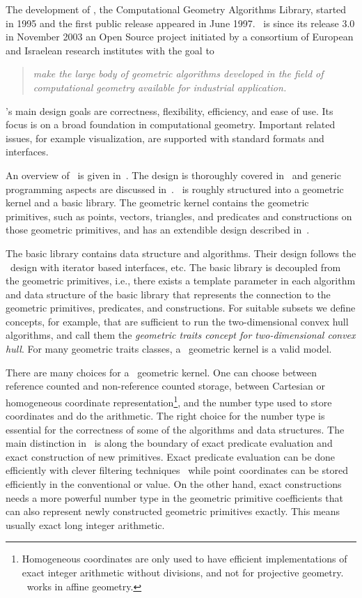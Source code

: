 The development of \cgal, the Computational Geometry Algorithms
Library, started in 1995 and the first public release appeared in June
1997. \cgal\ is since its release 3.0 in November 2003 an Open Source
project initiated by a consortium of European and Israelean research
institutes with the goal to
\begin{quote}
    {\em make the large body of geometric algorithms developed in the field
    of computational geometry available for industrial application.}
\end{quote}
\cgal's main design goals are correctness, flexibility, efficiency,
and ease of use. Its focus is on a broad foundation in computational
geometry. Important related issues, for example visualization, are
supported with standard formats and interfaces.

An overview of \cgal\ is given in~\cite{Kettner04Handbook}. The design
is thoroughly covered in~\cite{fgkss-dccga-00} and generic programming
aspects are discussed in~\cite{bksv-agppd-00}. \cgal\ is roughly
structured into a geometric kernel and a basic library. The geometric
kernel contains the geometric primitives, such as points, vectors,
triangles, and predicates and constructions on those geometric
primitives, and has an extendible design described
in~\cite{hhkps-aegk-01}. 

The basic library contains data structure and
algorithms.  Their design follows the \stl\ design with iterator based
interfaces, etc. The basic library is decoupled from the geometric
primitives, i.e., there exists a template parameter in each
algorithm and data structure of the basic library that represents the
connection to the geometric primitives, predicates, and constructions.
For suitable subsets we define concepts, for example,
that are sufficient to run the two-dimensional convex hull algorithms,
and call them the \emph{geometric traits concept for two-dimensional
convex hull}. For many geometric traits classes, a \cgal\ geometric
kernel is a valid model.

There are many choices for a \cgal\ geometric kernel. One can choose
between reference counted and non-reference counted storage, between
Cartesian or homogeneous coordinate
representation\footnote{Homogeneous coordinates are only used to have
  efficient implementations of exact integer arithmetic without
  divisions, and not for projective geometry. \cgal\ works in affine
  geometry.}, and the number type used to store coordinates and do the
arithmetic. The right choice for the number type is essential for the
correctness of some of the algorithms and data structures. The main
distinction in \cgal\ is along the boundary of exact predicate
evaluation and exact construction of new primitives. Exact predicate
evaluation can be done efficiently with clever filtering
techniques~\cite{bbp-iayed-01} while point coordinates can be stored
efficiently in the conventional  or 
value. On the other hand, exact constructions needs a more powerful
number type in the geometric primitive coefficients that can also
represent newly constructed geometric primitives exactly. This means
usually exact long integer arithmetic. 

